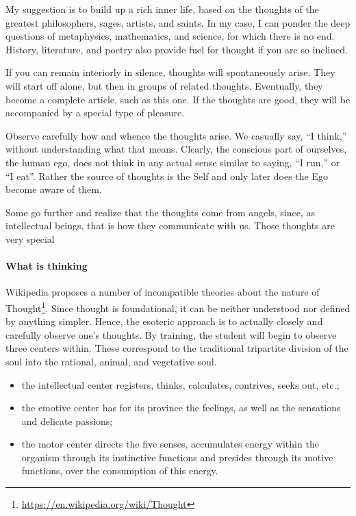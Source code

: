 My suggestion is to build up a rich inner life, based on the thoughts of the greatest philosophers, sages, artists, and saints. In my case, I can ponder the deep questions of metaphysics, mathematics, and science, for which there is no end. History, literature, and poetry also provide fuel for thought if you are so inclined.

If you can remain interiorly in silence, thoughts will spontaneously arise. They will start off alone, but then in groups of related thoughts. Eventually, they become a complete article, such as this one. If the thoughts are good, they will be accompanied by a special type of pleasure.

Observe carefully how and whence the thoughts arise. We casually say, ``I think,'' without understanding what that means. Clearly, the conscious part of ourselves, the human ego, does not think in any actual sense similar to saying, ``I run,'' or ``I eat''. Rather the source of thoughts is the Self and only later does the Ego become aware of them.

Some go further and realize that the thoughts come from angels, since, as intellectual beings, that is how they communicate with us. Those thoughts are very special

\paragraph{What is thinking}


Wikipedia proposes a number of incompatible theories about the nature of Thought\footnote{\url{https://en.wikipedia.org/wiki/Thought}}. Since thought is foundational, it can be neither understood nor defined by anything simpler. Hence, the esoteric approach is to actually closely and carefully observe one's thoughts. By training, the student will begin to observe three centers within. These correspond to the traditional tripartite division of the soul into the rational, animal, and vegetative soul.

\begin{itemize}


\item the intellectual center registers, thinks, calculates, contrives, seeks out, etc.;

\item the emotive center has for its province the feelings, as well as the sensations and delicate passions;

\item the motor center directs the five senses, accumulates energy within the organism through its instinctive functions and presides through its motive functions, over the consumption of this energy.
\end{itemize}


